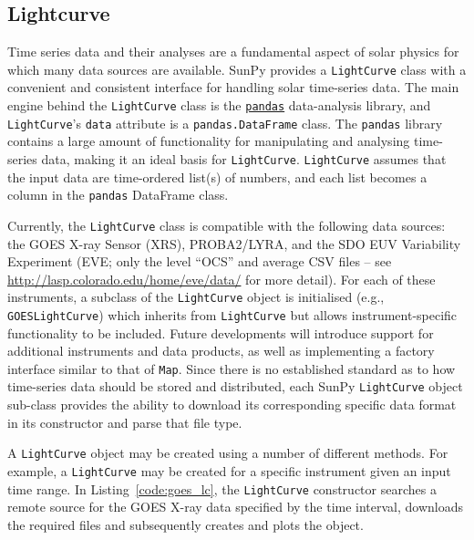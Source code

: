 \subsection{Lightcurve}\label{ssec:lightcurve}

Time series data and their analyses are a fundamental aspect of solar
physics for which many data sources are available.
SunPy provides a \texttt{LightCurve} class
with a convenient and consistent interface for handling solar time-series
data.  The main engine behind the \texttt{LightCurve} class is
the \href{http://pandas.pydata.org}{\texttt{pandas}} data-analysis library, and 
\texttt{LightCurve}'s \texttt{data} attribute is a \texttt{pandas.DataFrame} 
class.
The \texttt{pandas} library contains a large amount
of functionality for manipulating and analysing time-series data,
making it an ideal basis for \texttt{LightCurve}.  \texttt{LightCurve}
assumes that the input data are time-ordered list(s) of numbers, and each
list becomes a column in the \texttt{pandas} DataFrame class.

Currently, the \texttt{LightCurve} class is compatible with the
following data sources: the GOES X-ray Sensor (XRS), PROBA2/LYRA, and
the SDO EUV Variability Experiment (EVE; only the level ``OCS'' and
average CSV files -- see \url{http://lasp.colorado.edu/home/eve/data/}
for more detail).  For each of these instruments, a subclass of the
\texttt{LightCurve} object is initialised
(e.g., \texttt{GOESLightCurve}) which inherits from
\texttt{LightCurve} but allows instrument-specific functionality to be
included.  Future developments will introduce support for additional
instruments and data products, as well as implementing a factory interface 
similar to that of \texttt{Map}.  Since there is no established standard
as to how time-series data should be stored and distributed, each SunPy 
\texttt{LightCurve} object sub-class provides the ability to download its corresponding 
specific data format in its constructor and parse that file type.

A \texttt{LightCurve} object may be created using a number of different methods. 
For example, a \texttt{LightCurve} may be created for a specific instrument given
an input time range. In Listing~\ref{code:goes_lc}, 
the \texttt{LightCurve} constructor searches a remote source for the GOES X-ray 
data specified by the time interval, downloads the required files and 
subsequently creates and plots the object.

